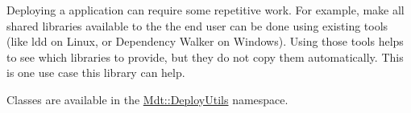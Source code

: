 Deploying a application can require some repetitive work. For example, make all shared libraries available to the the end user can be done using existing tools (like ldd on Linux, or Dependency Walker on Windows). Using those tools helps to see which libraries to provide, but they do not copy them automatically. This is one use case this library can help.

Classes are available in the \hyperlink{namespace_mdt_1_1_deploy_utils}{Mdt\+::\+Deploy\+Utils} namespace. 